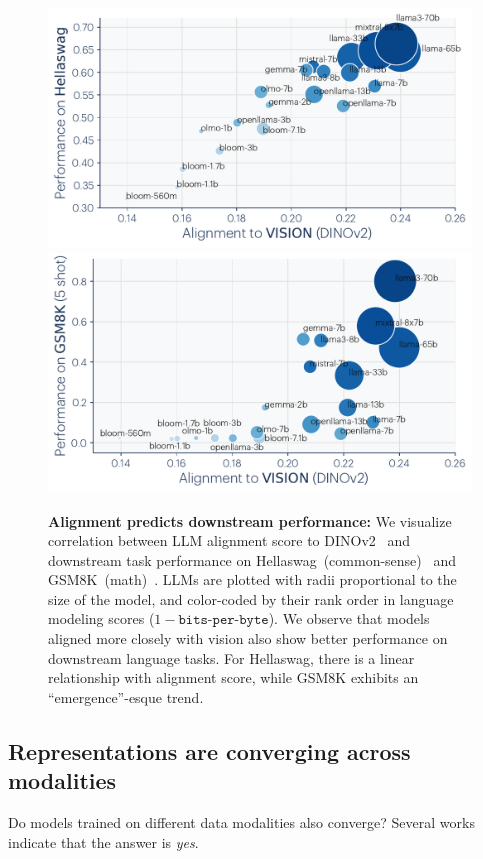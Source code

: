 \documentclass{article}
\theoremstyle{plain}
\theoremstyle{definition}
\theoremstyle{remark}
\begin{document}
\begin{figure}[ht]
    \centering
    \includegraphics[width=0.5\linewidth]{figures/alignment_hellaswag.pdf}%
    \hfill%
    \includegraphics[width=0.5\linewidth]{figures/alignment_gsm8k.pdf}\\[-0.15in]
    \caption{\small\textbf{Alignment predicts downstream performance:} We visualize correlation between LLM alignment score to DINOv2~\cite{oquab2023dinov2} and downstream task performance on Hellaswag~(common-sense)~\cite{zellers2019hellaswag} and GSM8K~(math)~\cite{cobbe2021gsm8k}. LLMs are plotted with radii proportional to the size of the model, and color-coded by their rank order in language modeling scores ($1 - \texttt{bits-per-byte}$). We observe that models aligned more closely with vision also show better performance on downstream language tasks. For Hellaswag, there is a linear relationship with alignment score, while GSM8K exhibits an ``emergence''-esque trend. 
    } 
    \label{fig:downstream}
\end{figure}


\subsection{Representations are converging across modalities}
Do models trained on different data modalities also converge?
Several works indicate that the answer is \emph{yes}. 
\end{document}
